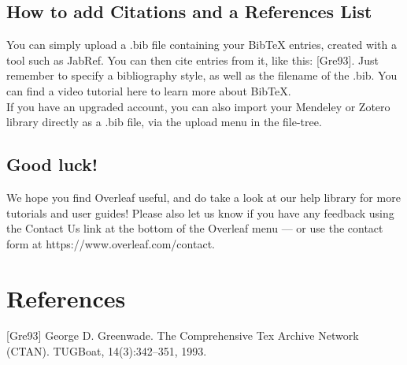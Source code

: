 \documentclass{article}
\begin{document}
	\subsection{How to add Citations and a References List}
	You can simply upload a .bib file containing your BibTeX entries, created with a tool such as JabRef. You can then cite entries from it, like this: [Gre93]. Just remember to specify a bibliography style, as well as the filename of the .bib. You can find a video tutorial here to learn more about BibTeX.\\
	\indent If you have an upgraded account, you can also import your Mendeley or Zotero library directly as a .bib file, via the upload menu in the file-tree.
	
	\subsection{Good luck!}
	We hope you find Overleaf useful, and do take a look at our help library for more tutorials and user guides! Please also let us know if you have any feedback using the Contact Us link at the bottom of the Overleaf menu — or use the contact form at https://www.overleaf.com/contact.\\
	
	\section*{References}
    [Gre93] George D. Greenwade. The Comprehensive Tex Archive Network (CTAN). TUGBoat,
	14(3):342–351, 1993.
	
\end{document}
